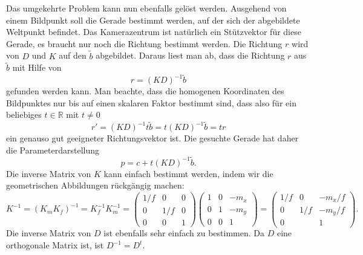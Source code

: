 Das umgekehrte Problem kann nun ebenfalls gelöst werden.
Ausgehend von einem Bildpunkt soll die Gerade bestimmt werden, auf der
sich der abgebildete Weltpunkt befindet.
Das Kamerazentrum ist natürlich ein Stützvektor für diese Gerade, es
braucht nur noch die Richtung bestimmt werden.
Die Richtung $r$ wird von $D$ und $K$ auf den $\tilde b$ abgebildet.
Daraus liest man ab, dass die Richtung $r$ aus $\tilde b$
mit Hilfe von
\[
r = (KD)^{-1} \tilde b
\]
gefunden werden kann.
Man beachte, dass die homogenen Koordinaten des Bildpunktes nur bis auf
einen skalaren Faktor bestimmt sind, dass also für ein beliebiges
$t\in\mathbb R$ mit $t\ne 0$ 
\[
r' = (KD)^{-1} t\tilde b = t (KD)^{-1} \tilde b=tr
\]
ein genauso gut geeigneter Richtungsvektor ist.
Die gesuchte Gerade hat daher die Parameterdarstellung
\[
p = c + t (KD)^{-1}\tilde b.
\]
Die inverse Matrix von $K$ kann einfach bestimmt werden, indem wir die
geometrischen Abbildungen rückgängig machen:
\[
K^{-1}
=
(K_mK_f)^{-1}
=
K_f^{-1}K_m^{-1}
=
\begin{pmatrix}
1/f& 0 & 0\\
0  &1/f& 0\\
0  & 0 & 1
\end{pmatrix}
\begin{pmatrix}
1&0&-m_x\\
0&1&-m_y\\
0&0&1
\end{pmatrix}
=
\begin{pmatrix}
1/f& 0 & -m_x/f\\
 0 &1/f& -m_y/f\\
 0 &   &  1
\end{pmatrix}.
\]
Die inverse Matrix von $D$ ist ebenfalls sehr einfach zu bestimmen.
Da $D$ eine orthogonale Matrix ist, ist $D^{-1}=D^t$.


